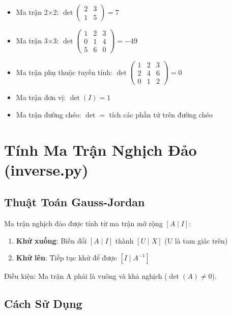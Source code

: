 \documentclass[12pt, a4paper, twoside]{article}
\begin{document}
\begin{itemize}
    \item Ma trận 2×2: $\det\begin{pmatrix} 2 & 3 \\ 1 & 5 \end{pmatrix} = 7$
    
    \item Ma trận 3×3: $\det\begin{pmatrix} 1 & 2 & 3 \\ 0 & 1 & 4 \\ 5 & 6 & 0 \end{pmatrix} = -49$
    
    \item Ma trận phụ thuộc tuyến tính: $\det\begin{pmatrix} 1 & 2 & 3 \\ 2 & 4 & 6 \\ 0 & 1 & 2 \end{pmatrix} = 0$
    
    \item Ma trận đơn vị: $\det(I) = 1$
    
    \item Ma trận đường chéo: $\det = $ tích các phần tử trên đường chéo
\end{itemize}

\newpage

\section{Tính Ma Trận Nghịch Đảo (inverse.py)}

\subsection{Thuật Toán Gauss-Jordan}

Ma trận nghịch đảo được tính từ ma trận mở rộng $[A \mid I]$:

\begin{enumerate}
    \item \textbf{Khử xuống}: Biến đổi $[A \mid I]$ thành $[U \mid X]$ (U là tam giác trên)
    \item \textbf{Khử lên}: Tiếp tục khử để được $[I \mid A^{-1}]$
\end{enumerate}

Điều kiện: Ma trận A phải là vuông và khả nghịch ($\det(A) \neq 0$).

\subsection{Cách Sử Dụng}
\end{document}

